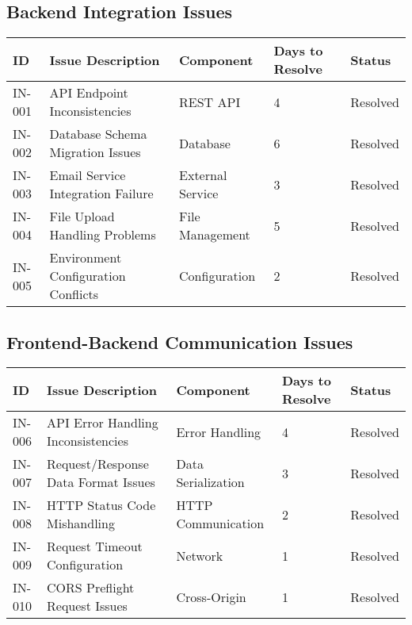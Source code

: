 \documentclass[12pt,a4paper]{article}
\begin{document}
\subsection{Backend Integration Issues}

\begin{longtable}{|p{1cm}|p{5cm}|p{2cm}|p{2cm}|p{2cm}|}
\hline
\textbf{ID} & \textbf{Issue Description} & \textbf{Component} & \textbf{Days to Resolve} & \textbf{Status} \\
\hline
IN-001 & API Endpoint Inconsistencies & REST API & 4 & \cellcolor{green!30}Resolved \\
\hline
IN-002 & Database Schema Migration Issues & Database & 6 & \cellcolor{green!30}Resolved \\
\hline
IN-003 & Email Service Integration Failure & External Service & 3 & \cellcolor{green!30}Resolved \\
\hline
IN-004 & File Upload Handling Problems & File Management & 5 & \cellcolor{green!30}Resolved \\
\hline
IN-005 & Environment Configuration Conflicts & Configuration & 2 & \cellcolor{green!30}Resolved \\
\hline
\end{longtable}

\subsection{Frontend-Backend Communication Issues}

\begin{longtable}{|p{1cm}|p{5cm}|p{2cm}|p{2cm}|p{2cm}|}
\hline
\textbf{ID} & \textbf{Issue Description} & \textbf{Component} & \textbf{Days to Resolve} & \textbf{Status} \\
\hline
IN-006 & API Error Handling Inconsistencies & Error Handling & 4 & \cellcolor{green!30}Resolved \\
\hline
IN-007 & Request/Response Data Format Issues & Data Serialization & 3 & \cellcolor{green!30}Resolved \\
\hline
IN-008 & HTTP Status Code Mishandling & HTTP Communication & 2 & \cellcolor{green!30}Resolved \\
\hline
IN-009 & Request Timeout Configuration & Network & 1 & \cellcolor{green!30}Resolved \\
\hline
IN-010 & CORS Preflight Request Issues & Cross-Origin & 1 & \cellcolor{green!30}Resolved \\
\hline
\end{longtable}
\end{document}
